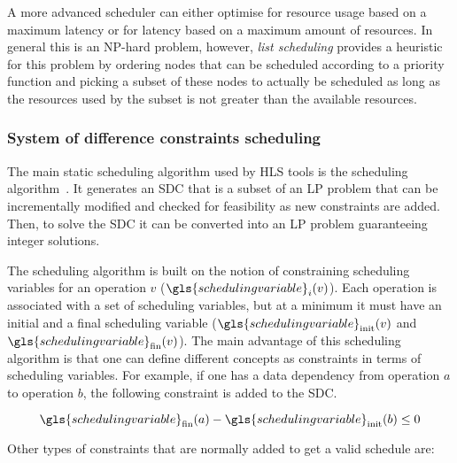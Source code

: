 A more advanced scheduler can either optimise for resource usage based on a
maximum latency or for latency based on a maximum amount of resources.  In
general this is an NP-hard problem, however, \emph{\gls{list scheduling}}
provides a heuristic for this problem by ordering nodes that can be scheduled
according to a priority function and picking a subset of these nodes to actually
be scheduled as long as the resources used by the subset is not greater than the
available resources.

\subsubsection{System of difference constraints scheduling}

The main static scheduling algorithm used by \gls{HLS} tools is the
 scheduling algorithm~\cite{cong06_sdc}.  It
generates an \gls{SDC} that is a subset of an \gls{LP} problem that can be
incrementally modified and checked for feasibility as new constraints are added.
Then, to solve the \gls{SDC} it can be converted into an \gls{LP} problem
guaranteeing integer solutions.

The scheduling algorithm is built on the notion of constraining scheduling
variables for an operation $v$ ($\gls{scheduling variable}_i(v)$).  Each
operation is associated with a set of scheduling variables, but at a minimum it
must have an initial and a final scheduling variable
($\gls{scheduling variable}_{\mathrm{init}}(v)$ and
$\gls{scheduling variable}_{\mathrm{fin}}(v)$).  The main advantage of this
scheduling algorithm is that one can define different concepts as constraints in
terms of scheduling variables.  For example, if one has a data dependency from
operation $a$ to operation $b$, the following constraint is added to the
\gls{SDC}.

\begin{equation*}
  \gls{scheduling variable}_{\mathrm{fin}}(a) - \gls{scheduling
    variable}_{\mathrm{init}}(b) \leq 0
\end{equation*}

Other types of constraints that are normally added to get a valid schedule are:

